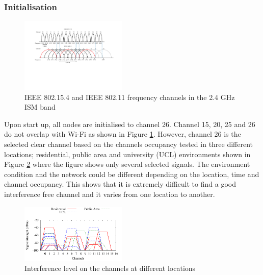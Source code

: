 \subsubsection{Initialisation}
\begin{figure}
\centering
\includegraphics[trim=3cm 8cm 2cm 2cm, clip=true, width=0.45\textwidth]{figures/freqBand.pdf}
\caption{IEEE 802.15.4 and IEEE 802.11 frequency channels in the 2.4 GHz ISM band}
\label{fig:freqBand}
\end{figure}

Upon start up, all nodes are initialised to channel 26. 
Channel 15, 20, 25 and 26 do not overlap with Wi-Fi as shown in Figure \ref{fig:freqBand}. However, channel 26 is the selected clear channel based on the channels occupancy tested in three different locations; residential, public area and university (UCL) environments shown in Figure \ref{fig:interference2} where the figure shows only several selected signals. The environment condition and the network could be different depending on the location, time and channel occupancy. This shows that it is extremely difficult to find a good interference free channel and it varies from one location to another.

\begin{figure}
\centering
\includegraphics[width=0.45\textwidth]{figures/interference.pdf}
\caption{Interference level on the channels at different locations}
\label{fig:interference2}
\end{figure}

